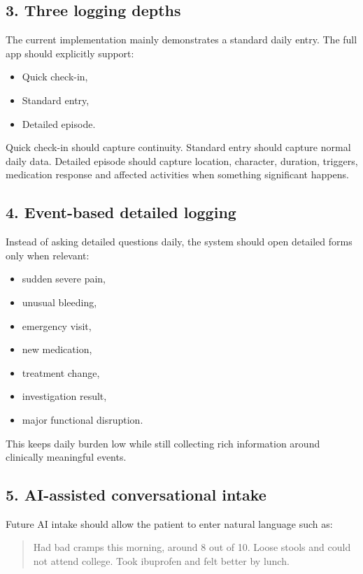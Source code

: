 \documentclass[11pt,a4paper]{article}
\begin{document}
\subsection{3. Three logging depths}

The current implementation mainly demonstrates a standard daily entry. The full app should explicitly support:

\begin{itemize}
  \item Quick check-in,
  \item Standard entry,
  \item Detailed episode.
\end{itemize}

Quick check-in should capture continuity. Standard entry should capture normal daily data. Detailed episode should capture location, character, duration, triggers, medication response and affected activities when something significant happens.

\subsection{4. Event-based detailed logging}

Instead of asking detailed questions daily, the system should open detailed forms only when relevant:

\begin{itemize}
  \item sudden severe pain,
  \item unusual bleeding,
  \item emergency visit,
  \item new medication,
  \item treatment change,
  \item investigation result,
  \item major functional disruption.
\end{itemize}

This keeps daily burden low while still collecting rich information around clinically meaningful events.

\subsection{5. AI-assisted conversational intake}

Future AI intake should allow the patient to enter natural language such as:

\begin{quote}
Had bad cramps this morning, around 8 out of 10. Loose stools and could not attend college. Took ibuprofen and felt better by lunch.
\end{quote}
\end{document}
